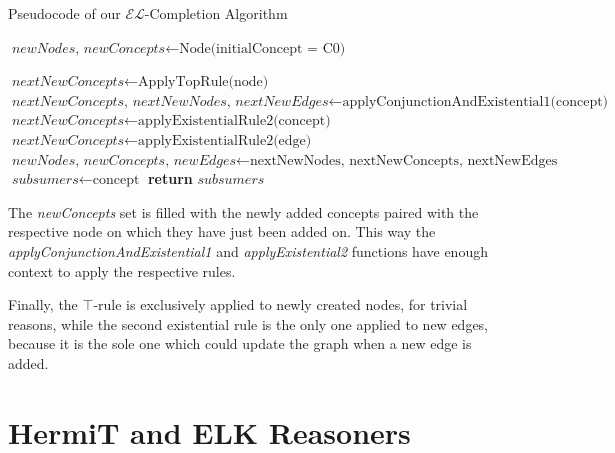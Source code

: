 \documentclass[a4paper]{article}
\theoremstyle{plain}
\theoremstyle{definition}
\begin{document}
    

    \begin{algorithm}
    \caption{Pseudocode of our $\mathcal{EL}$-Completion Algorithm}
    \label{alg:your_alg}
    \begin{algorithmic}[1] %
        \State $\textit{newNodes, newConcepts} \gets \text{Node(initialConcept = C0)}$
            
        
        
                \State $\textit{nextNewConcepts} \gets \text{ApplyTopRule(node)}$
            \EndFor
                \State $\textit{nextNewConcepts, nextNewNodes, nextNewEdges} \gets \text{applyConjunctionAndExistential1(concept)}$
                \State $\textit{nextNewConcepts} \gets \text{applyExistentialRule2(concept)}$
            \EndFor
                \State $\textit{nextNewConcepts} \gets \text{applyExistentialRule2(edge)}$
            \EndFor
            \State $\textit{newNodes, newConcepts, newEdges} \gets \text{nextNewNodes, nextNewConcepts, nextNewEdges}$
        \EndWhile
                \State $\textit{subsumers} \gets \text{concept}$
            \EndIf
        \EndFor
        \State \textbf{return} $\textit{subsumers}$
    \EndProcedure
    \end{algorithmic}
    \end{algorithm}

    The \textit{newConcepts} set is filled with the newly added concepts paired with the respective node on which they have just been added on. This way the \textit{applyConjunctionAndExistential1} and \textit{applyExistential2} functions have enough context to apply the respective rules.
    
    Finally, the  $\top$-rule is exclusively applied to newly created nodes, for trivial reasons, while the second existential rule is the only one applied to new edges, because it is the sole one which could update the graph when a new edge is added.
    

    \section{HermiT and ELK Reasoners}
\end{document}
